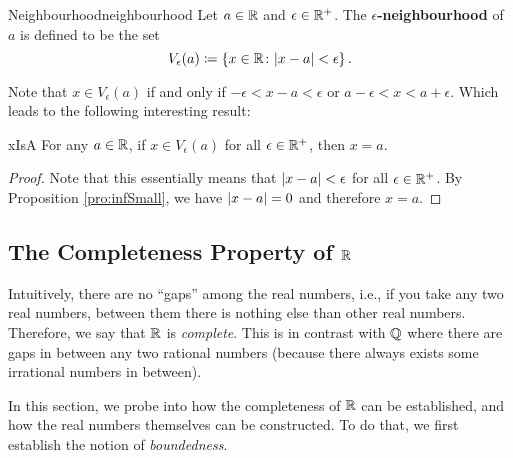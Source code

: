 \documentclass[math]{amznotes}
\theoremstyle{remark}
\begin{document}
\begin{dfnbox}{Neighbourhood}{neighbourhood}
    Let $a \in \mathbb{R}$ and $\epsilon \in \mathbb{R}^+$. The {\color{red} \textbf{$\epsilon$-neighbourhood}} of $a$ is defined to be the set
    \begin{displaymath}
        V_\epsilon(a) \coloneqq \left\{x \in \mathbb{R} \colon {\left\lvert {x - a} \right\rvert} < \epsilon\right\}.
    \end{displaymath}
\end{dfnbox}
Note that $x \in V_\epsilon(a)$ if and only if $-\epsilon < x - a < \epsilon$ or $a - \epsilon < x < a + \epsilon$. Which leads to the following interesting result:
\begin{probox}{}{xIsA}
    For any $a \in \mathbb{R}$, if $x \in V_\epsilon(a)$ for all $\epsilon \in \mathbb{R}^+$, then $x = a$.
    \tcblower
    \begin{proof}
        Note that this essentially means that ${\left\lvert {x - a} \right\rvert} < \epsilon$ for all $\epsilon \in \mathbb{R}^+$. By Proposition \ref{pro:infSmall}, we have ${\left\lvert {x - a} \right\rvert} = 0$ and therefore $x = a$.
    \end{proof}
\end{probox}

\subsection{The Completeness Property of $\mathbb{R}$}
Intuitively, there are no ``gaps'' among the real numbers, i.e., if you take any two real numbers, between them there is nothing else than other real numbers. Therefore, we say that $\mathbb{R}$ is \textit{complete}. This is in contrast with $\mathbb{Q}$ where there are gaps in between any two rational numbers (because there always exists some irrational numbers in between).

In this section, we probe into how the completeness of $\mathbb{R}$ can be established, and how the real numbers themselves can be constructed. To do that, we first establish the notion of \textit{boundedness}.
\end{document}
